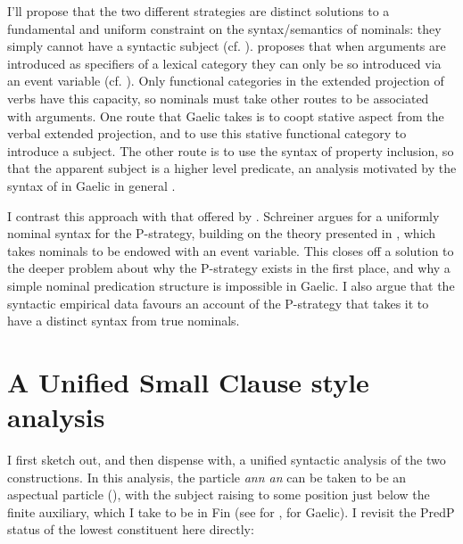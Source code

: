 \documentclass[output=paper]{langsci/langscibook}
\begin{document}
I'll propose that the two different strategies are distinct solutions to a
fundamental and uniform constraint on the syntax/semantics of nominals: they
simply cannot have a syntactic subject (cf. \citealt{Baker03}).
\citet{adgerbook} proposes that when arguments are introduced as specifiers of a
lexical category they can only be so introduced via an event variable (cf.
\citealt{kratzer96}). Only functional categories in the extended projection of
verbs have this capacity, so nominals must take other routes to be associated
with arguments. One route that Gaelic takes is to coopt stative aspect from the
verbal extended projection, and to use this stative functional category to
introduce a subject. The other route is to use the syntax of property
inclusion, so that the apparent subject is a higher level predicate, an
analysis motivated by the syntax of  in Gaelic in general
\parencite{Adger2011b}.

I contrast this approach with that offered by \citet{schreiner:15}. Schreiner
argues for a uniformly nominal syntax for the P-strategy, building on the
theory presented in \citet{roy:06}, which takes nominals to be endowed with an
event variable. This closes off a solution to the deeper problem about why the
P-strategy exists in the first place, and why a simple nominal predication
structure is impossible in Gaelic. I also argue that the syntactic empirical
data favours an account of the P-strategy that takes it to have a distinct
syntax from true nominals.

\section{A Unified Small Clause style analysis}\label{pred-inv}

I first sketch out, and then dispense with, a unified syntactic analysis of the two constructions. In
this analysis, the particle \emph{ann an} can be taken to be an aspectual
particle (\citealt{cram:83}), with the subject raising to some position just
below the finite auxiliary, which I take to be in Fin (see \citealt{Roberts2005}
for , \citealt{adger:07} for Gaelic). I revisit the PredP status of the
lowest constituent here directly:

\ea
\end{document}
